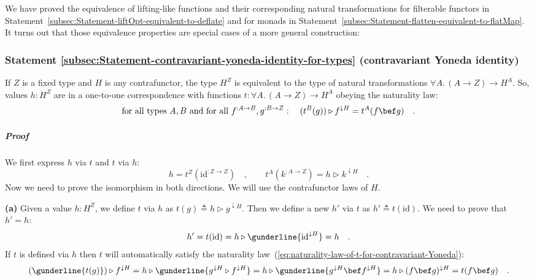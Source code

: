 We have proved the equivalence of lifting-like functions and their
corresponding natural transformations for filterable functors in Statement~\ref{subsec:Statement-liftOpt-equivalent-to-deflate}
and for monads in Statement~\ref{subsec:Statement-flatten-equivalent-to-flatMap}.
It turns out that those equivalence properties are special cases of
a more general construction:

\subsubsection{Statement \label{subsec:Statement-contravariant-yoneda-identity-for-types}\ref{subsec:Statement-contravariant-yoneda-identity-for-types}
(contravariant Yoneda identity)}

If $Z$ is a fixed type and $H$ is any contrafunctor, the type $H^{Z}$
is equivalent to the type of natural transformations $\forall A.\,(A\rightarrow Z)\rightarrow H^{A}$.
So, values $h:H^{Z}$ are in a one-to-one correspondence with functions
$t:\forall A.\,(A\rightarrow Z)\rightarrow H^{A}$ obeying the naturality
law:
\begin{equation}
\text{for all types }A,B\text{ and for all }f^{:A\rightarrow B},g^{:B\rightarrow Z}:\quad(t^{B}(g))\triangleright f^{\downarrow H}=t^{A}(f\bef g)\quad.\label{eq:naturality-law-of-t-for-contravariant-Yoneda}
\end{equation}
 

\subparagraph{Proof}

We first express $h$ via $t$ and $t$ via $h$:
\[
h=t^{Z}(\text{id}^{:Z\rightarrow Z})\quad,\quad\quad t^{A}(k^{:A\rightarrow Z})=h\triangleright k^{\downarrow H}\quad.
\]
 Now we need to prove the isomorphism in both directions. We will
use the contrafunctor laws of $H$.

\textbf{(a)} Given a value $h:H^{Z}$, we define $t$ via $h$ as
$t(g)\triangleq h\triangleright g^{\downarrow H}$. Then we define
a new $h'$ via $t$ as $h'\triangleq t(\text{id})$. We need to prove
that $h'=h$:
\[
h'=t(\text{id})=h\triangleright\gunderline{\text{id}^{\downarrow H}}=h\quad.
\]
If $t$ is defined via $h$ then $t$ will automatically satisfy the
naturality law~(\ref{eq:naturality-law-of-t-for-contravariant-Yoneda}):
\[
(\gunderline{t(g)})\triangleright f^{\downarrow H}=h\triangleright\gunderline{g^{\downarrow H}\triangleright f^{\downarrow H}}=h\triangleright\gunderline{g^{\downarrow H}\bef f^{\downarrow H}}=h\triangleright(f\bef g)^{\downarrow H}=t(f\bef g)\quad.
\]

